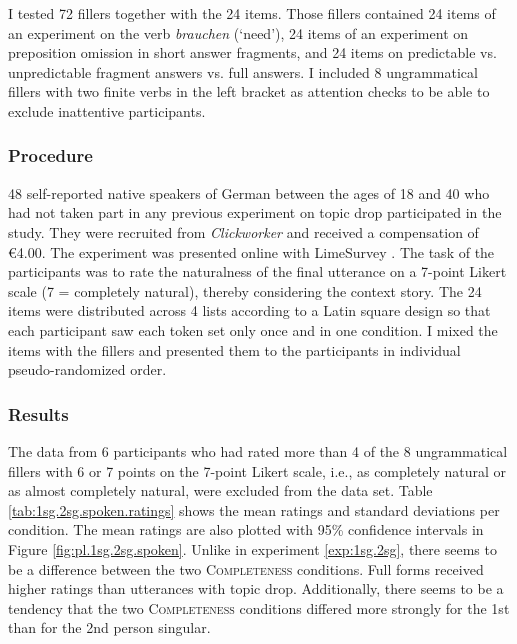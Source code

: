 I tested 72 fillers together with the 24 items.
Those fillers contained 24 items of an experiment on the verb \textit{brauchen} (`need'), 24 items of an experiment on preposition omission in short answer fragments, and 24 items on predictable vs. unpredictable fragment answers vs. full answers.
I included 8 ungrammatical fillers with two finite verbs in the left bracket as attention checks to be able to exclude inattentive participants.

\subsubsection{Procedure}
48 self-reported native speakers of German between the ages of 18 and 40 who had not taken part in any previous experiment on topic drop participated in the study.
They were recruited from \emph{Clickworker} and received a compensation of €4.00.
The experiment was presented online with LimeSurvey \citep{limesurveygmbh}.
The task of the participants was to rate the naturalness of the final utterance on a 7-point Likert scale (7 = completely natural), thereby considering the context story.
The 24 items were distributed across 4 lists according to a Latin square design so that each participant saw each token set only once and in one condition.
I mixed the items with the fillers and presented them to the participants in individual pseudo-randomized order.

\subsubsection{Results}
The data from 6 participants who had rated more than 4 of the 8 ungrammatical fillers with 6 or 7 points on the 7-point Likert scale, i.e., as completely natural or as almost completely natural, were excluded from the data set.
Table \ref{tab:1sg.2sg.spoken.ratings} shows the mean ratings and standard deviations per condition.
The mean ratings are also plotted with 95\% confidence intervals in Figure \ref{fig:pl.1sg.2sg.spoken}.
Unlike in experiment \ref*{exp:1sg.2sg}, there seems to be a difference between the two \textsc{Completeness} conditions.
Full forms received higher ratings than utterances with topic drop.
Additionally, there seems to be a tendency that the two \textsc{Completeness} conditions differed more strongly for the 1st than for the 2nd person singular.

